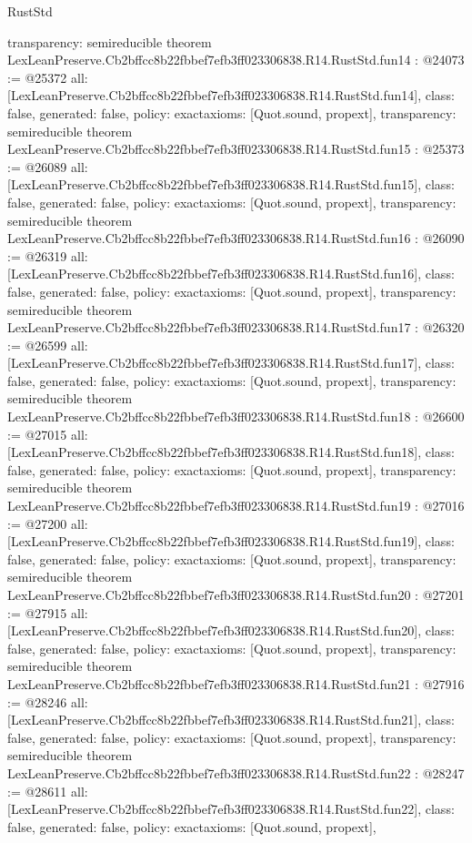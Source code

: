 \begin{lexlean}{RustStd}
\begin{coremodule}
{  transparency: semireducible
}
theorem LexLeanPreserve.Cb2bffcc8b22fbbef7efb3ff023306838.R14.RustStd.fun14 : @24073 := @25372 {
  all: [LexLeanPreserve.Cb2bffcc8b22fbbef7efb3ff023306838.R14.RustStd.fun14],
  class: false,
  generated: false,
  policy: exact{axioms: [Quot.sound, propext]},
  transparency: semireducible
}
theorem LexLeanPreserve.Cb2bffcc8b22fbbef7efb3ff023306838.R14.RustStd.fun15 : @25373 := @26089 {
  all: [LexLeanPreserve.Cb2bffcc8b22fbbef7efb3ff023306838.R14.RustStd.fun15],
  class: false,
  generated: false,
  policy: exact{axioms: [Quot.sound, propext]},
  transparency: semireducible
}
theorem LexLeanPreserve.Cb2bffcc8b22fbbef7efb3ff023306838.R14.RustStd.fun16 : @26090 := @26319 {
  all: [LexLeanPreserve.Cb2bffcc8b22fbbef7efb3ff023306838.R14.RustStd.fun16],
  class: false,
  generated: false,
  policy: exact{axioms: [Quot.sound, propext]},
  transparency: semireducible
}
theorem LexLeanPreserve.Cb2bffcc8b22fbbef7efb3ff023306838.R14.RustStd.fun17 : @26320 := @26599 {
  all: [LexLeanPreserve.Cb2bffcc8b22fbbef7efb3ff023306838.R14.RustStd.fun17],
  class: false,
  generated: false,
  policy: exact{axioms: [Quot.sound, propext]},
  transparency: semireducible
}
theorem LexLeanPreserve.Cb2bffcc8b22fbbef7efb3ff023306838.R14.RustStd.fun18 : @26600 := @27015 {
  all: [LexLeanPreserve.Cb2bffcc8b22fbbef7efb3ff023306838.R14.RustStd.fun18],
  class: false,
  generated: false,
  policy: exact{axioms: [Quot.sound, propext]},
  transparency: semireducible
}
theorem LexLeanPreserve.Cb2bffcc8b22fbbef7efb3ff023306838.R14.RustStd.fun19 : @27016 := @27200 {
  all: [LexLeanPreserve.Cb2bffcc8b22fbbef7efb3ff023306838.R14.RustStd.fun19],
  class: false,
  generated: false,
  policy: exact{axioms: [Quot.sound, propext]},
  transparency: semireducible
}
theorem LexLeanPreserve.Cb2bffcc8b22fbbef7efb3ff023306838.R14.RustStd.fun20 : @27201 := @27915 {
  all: [LexLeanPreserve.Cb2bffcc8b22fbbef7efb3ff023306838.R14.RustStd.fun20],
  class: false,
  generated: false,
  policy: exact{axioms: [Quot.sound, propext]},
  transparency: semireducible
}
theorem LexLeanPreserve.Cb2bffcc8b22fbbef7efb3ff023306838.R14.RustStd.fun21 : @27916 := @28246 {
  all: [LexLeanPreserve.Cb2bffcc8b22fbbef7efb3ff023306838.R14.RustStd.fun21],
  class: false,
  generated: false,
  policy: exact{axioms: [Quot.sound, propext]},
  transparency: semireducible
}
theorem LexLeanPreserve.Cb2bffcc8b22fbbef7efb3ff023306838.R14.RustStd.fun22 : @28247 := @28611 {
  all: [LexLeanPreserve.Cb2bffcc8b22fbbef7efb3ff023306838.R14.RustStd.fun22],
  class: false,
  generated: false,
  policy: exact{axioms: [Quot.sound, propext]},
}
\end{coremodule}
\end{lexlean}
